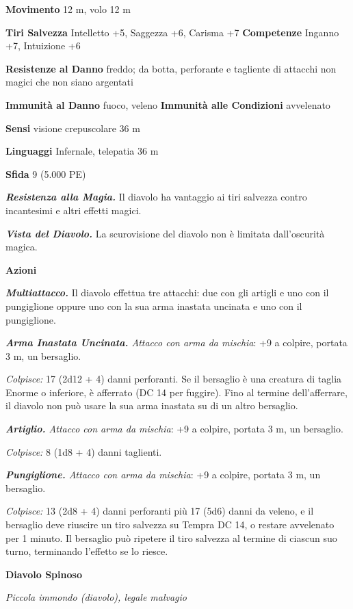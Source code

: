 \begin{multicols}{2}
\textbf{Movimento} 12 m, volo 12 m

\textbf{Tiri Salvezza} Intelletto +5, Saggezza +6, Carisma +7
\textbf{Competenze} Inganno +7, Intuizione +6

\textbf{Resistenze al Danno} freddo; da botta, perforante e tagliente
di attacchi non magici che non siano argentati

\textbf{Immunità al Danno} fuoco, veleno \textbf{Immunità alle
Condizioni} avvelenato

\textbf{Sensi} visione crepuscolare 36 m

\textbf{Linguaggi} Infernale, telepatia 36 m 

\textbf{Sfida} 9 (5.000 PE)\smallskip

\emph{\textbf{Resistenza alla Magia.}} Il diavolo ha vantaggio ai tiri
salvezza contro incantesimi e altri effetti magici.

\emph{\textbf{Vista del Diavolo.}} La scurovisione del diavolo non è
limitata dall'oscurità magica.

\smallskip\textbf{Azioni}

\emph{\textbf{Multiattacco.}} Il diavolo effettua tre attacchi: due con
gli artigli e uno con il pungiglione oppure uno con la sua arma inastata
uncinata e uno con il pungiglione.

\emph{\textbf{Arma Inastata Uncinata.} Attacco con arma da mischia}: +9
a colpire, portata 3 m, un bersaglio.

\emph{Colpisce:} 17 (2d12 + 4) danni perforanti. Se il bersaglio è una
creatura di taglia Enorme o inferiore, è afferrato (DC 14 per fuggire).
Fino al termine dell'afferrare, il diavolo non può usare la sua arma
inastata su di un altro bersaglio.

\emph{\textbf{Artiglio.} Attacco con arma da mischia}: +9 a colpire,
portata 3 m, un bersaglio.

\emph{Colpisce:} 8 (1d8 + 4) danni taglienti.

\emph{\textbf{Pungiglione.} Attacco con arma da mischia}: +9 a colpire,
portata 3 m, un bersaglio.

\emph{Colpisce:} 13 (2d8 + 4) danni perforanti più 17 (5d6) danni da
veleno, e il bersaglio deve riuscire un tiro salvezza su Tempra DC
14, o restare avvelenato per 1 minuto. Il bersaglio può ripetere il tiro
salvezza al termine di ciascun suo turno, terminando l'effetto se lo
riesce.

\textbf{Diavolo Spinoso}

\emph{Piccola immondo (diavolo), legale malvagio}


\end{multicols}
